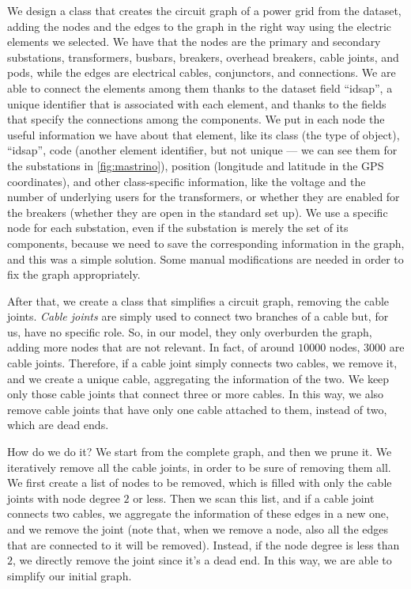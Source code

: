 We design a class that creates the circuit graph of a power grid from the dataset, adding the nodes and the edges to the graph in the right way using the electric elements we selected. We have that the nodes are the primary and secondary substations, transformers, busbars, breakers, overhead breakers, cable joints, and pods, while the edges are electrical cables, conjunctors, and connections. We are able to connect the elements among them thanks to the dataset field ``idsap'', a unique identifier that is associated with each element, and thanks to the fields that specify the connections among the components. We put in each node the useful information we have about that element, like its class (the type of object), ``idsap'', code (another element identifier, but not unique --- we can see them for the substations in \autoref{fig:mastrino}), position (longitude and latitude in the GPS coordinates), and other class-specific information, like the voltage and the number of underlying users for the transformers, or whether they are enabled for the breakers (whether they are open in the standard set up). We use a specific node for each substation, even if the substation is merely the set of its components, because we need to save the corresponding information in the graph, and this was a simple solution. Some manual modifications are needed in order to fix the graph appropriately.

After that, we create a class that simplifies a circuit graph, removing the cable joints. \emph{Cable joints} are simply used to connect two branches of a cable but, for us, have no specific role. So, in our model, they only overburden the graph, adding more nodes that are not relevant. In fact, of around $10000$ nodes, $3000$ are cable joints. Therefore, if a cable joint simply connects two cables, we remove it, and we create a unique cable, aggregating the information of the two. We keep only those cable joints that connect three or more cables. In this way, we also remove cable joints that have only one cable attached to them, instead of two, which are dead ends.

How do we do it? We start from the complete graph, and then we prune it. We iteratively remove all the cable joints, in order to be sure of removing them all. We first create a list of nodes to be removed, which is filled with only the cable joints with node degree $2$ or less. Then we scan this list, and if a cable joint connects two cables, we aggregate the information of these edges in a new one, and we remove the joint (note that, when we remove a node, also all the edges that are connected to it will be removed). Instead, if the node degree is less than $2$, we directly remove the joint since it's a dead end. In this way, we are able to simplify our initial graph.


